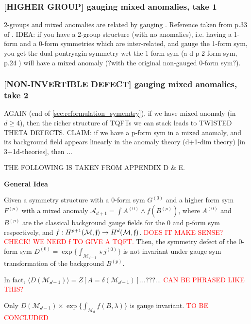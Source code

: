 \documentclass[aps,preprint,nofootinbib,preprintnumbers,eqsecnum,superscriptaddress]{revtex4}
\numberwithin{equation}{section}
\begin{document}
\subsubsection{[HIGHER GROUP] gauging mixed anomalies, take 1}
2-groups and mixed anomalies are related by gauging \cite{Tachikawa_2020}. Reference taken from p.33 of \cite{schafernameki_2023}.
IDEA: if you have a 2-group structure (with no anomalies), i.e. having a 1-form and a 0-form symmetries which are inter-related, and gauge the 1-form sym, you get the dual-pontryagin symmetry wrt the 1-form sym (a d-p-2-form sym, p.24 \cite{schafernameki_2023}) will have a mixed anomaly (?with the original non-gauged 0-form sym?).

\subsubsection{[NON-INVERTIBLE DEFECT] gauging mixed anomalies, take 2}
\label{sec:mix_anom_noninv_defect}
AGAIN (end of \ref{sec:reformulation_symemtry}), if we have mixed anomaly (in $d \geq 4$), then the richer structure of TQFTs we can stack leads to TWISTED THETA DEFECTS. CLAIM: if we have a p-form sym in a mixed anomaly, and its background field appears linearly in the anomaly theory (d+1-dim theory) [in 3+1d-theories], then ...

THE FOLLOWING IS TAKEN FROM \cite{Kaidi_2022} APPENDIX D \& E.
\begin{tcolorbox}

{\bf General Idea}

Given a symmetry structure with a 0-form sym $G^{(0)}$ and a higher form sym $F^{(p)}$ with a mixed anomaly $\mathcal{A}_{d+1}=\int A^{(0)} \wedge f(B^{(p)})$, where $A^{(0)}$ and $B^{(p)}$ are the classical background gauge fields for the 0 and p-form sym respectively, and $f:H^{p+1}(\mathcal{M},\frak{f}) \to H^{d}(\mathcal{M},\frak{f})$. \textcolor{red}{DOES IT MAKE SENSE? CHECK! WE NEED f TO GIVE A TQFT.} Then, the symmetry defect of the 0-form sym $D^{(0)}=\exp \{ \int_{\mathcal{M}_{d-1}} \star j^{(0)}\}$ is not invariant under gauge sym transformation of the background $B^{(p)}$.

In fact, $\langle D(\mathcal{M_{d-1}}) \rangle = Z[A=\delta(\mathcal{M_{d-1}})]$...???... \textcolor{red}{CAN BE PHRASED LIKE THIS?}

Only $ D(\mathcal{M_{d-1}}) \times \exp \{ \int_{\mathcal{M}_d} f(B,\lambda)\}$ is gauge invariant. \textcolor{red}{TO BE CONCLUDED}


\end{tcolorbox} 
\end{document}
